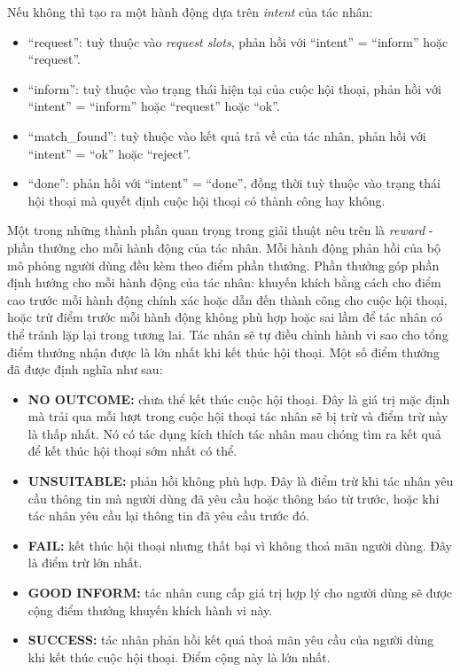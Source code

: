 Nếu không thì tạo ra một hành động dựa trên \textit{intent} của tác nhân:

\begin{itemize}
    \item \enquote{request}: tuỳ thuộc vào \textit{request slots},
    phản hồi với \enquote{intent} = \enquote{inform} hoặc \enquote{request}.
    \item \enquote{inform}: tuỳ thuộc vào trạng thái hiện tại của
    cuộc hội thoại, phản hồi với \enquote{intent} = \enquote{inform}
    hoặc \enquote{request} hoặc \enquote{ok}.
    \item \enquote{match\_found}: tuỳ thuộc vào kết quả trả về của tác nhân,
    phản hồi với \enquote{intent} = \enquote{ok} hoặc \enquote{reject}.
    \item \enquote{done}: phản hồi với \enquote{intent} = \enquote{done},
    đồng thời tuỳ thuộc vào trạng thái hội thoại mà quyết định cuộc hội thoại
    có thành công hay không.
\end{itemize}

Một trong những thành phần quan trọng trong giải thuật nêu trên là
\textit{reward} - phần thưởng cho mỗi hành động của tác nhân. Mỗi
hành động phản hồi của bộ mô phỏng người dùng đều kèm theo điểm
phần thưởng. Phần thưởng góp phần định hướng cho mỗi hành động của
tác nhân: khuyến khích bằng cách cho điểm cao trước mỗi hành động
chính xác hoặc dẫn đến thành công cho cuộc hội thoại, hoặc trừ điểm
trước mỗi hành động không phù hợp hoặc sai lầm để tác nhân có thể
tránh lặp lại trong tương lai. Tác nhân sẽ tự điều chỉnh hành vi
sao cho tổng điểm thưởng nhận được là lớn nhất khi kết thúc hội thoại.
Một số điểm thưởng đã được định nghĩa như sau:

\begin{itemize}
    \item \textbf{NO OUTCOME:} chưa thể kết thúc cuộc hội thoại.
    Đây là giá trị mặc định mà trải qua mỗi lượt trong cuộc hội thoại
    tác nhân sẽ bị trừ và điểm trừ này là thấp nhất. Nó có tác dụng
    kích thích tác nhân mau chóng tìm ra kết quả để kết thúc hội thoại
    sớm nhất có thể.
    \item \textbf{UNSUITABLE:} phản hồi không phù hợp. Đây là điểm trừ
    khi tác nhân yêu cầu thông tin mà người dùng đã yêu cầu hoặc thông báo
    từ trước, hoặc khi tác nhân yêu cầu lại thông tin đã yêu cầu trước đó.
    \item \textbf{FAIL:} kết thúc hội thoại nhưng thất bại vì không
    thoả mãn người dùng. Đây là điểm trừ lớn nhất.
    \item \textbf{GOOD INFORM:} tác nhân cung cấp giá trị hợp lý cho
    người dùng sẽ được cộng điểm thưởng khuyến khích hành vi này.
    \item \textbf{SUCCESS:} tác nhân phản hồi kết quả thoả mãn yêu cầu
    của người dùng khi kết thúc cuộc hội thoại. Điểm cộng này là lớn nhất.
\end{itemize}

